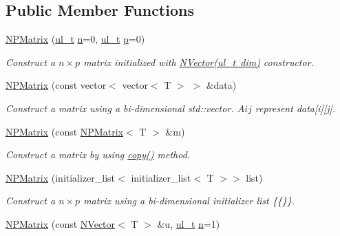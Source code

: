 \subsection*{Public Member Functions}
\begin{DoxyCompactItemize}
\item 
\mbox{\hyperlink{class_n_p_matrix_a911b2434435553b06276977f3a86bb87}{N\+P\+Matrix}} (\mbox{\hyperlink{typedef_8h_a1b140a2034db3f5dfe18a987745df43a}{ul\+\_\+t}} \mbox{\hyperlink{class_n_p_matrix_afc181b7652d9427125c72c38d7c1498d}{n}}=0, \mbox{\hyperlink{typedef_8h_a1b140a2034db3f5dfe18a987745df43a}{ul\+\_\+t}} \mbox{\hyperlink{class_n_p_matrix_a3beee8acb5babf62d2b4f212ac5d18e8}{p}}=0)
\begin{DoxyCompactList}\small\item\em Construct a $ n \times p $ matrix initialized with {\ttfamily \mbox{\hyperlink{class_n_vector_a58eee5f012e4e563d477788051fc7f1d}{N\+Vector(ul\+\_\+t dim)}}} constructor. \end{DoxyCompactList}\item 
\mbox{\hyperlink{class_n_p_matrix_ad5fc4003cdc740be5eed12134929101c}{N\+P\+Matrix}} (const vector$<$ vector$<$ T $>$ $>$ \&data)
\begin{DoxyCompactList}\small\item\em Construct a matrix using a bi-\/dimensional {\ttfamily std\+::vector}. $ Aij $ represent {\ttfamily data\mbox{[}i\mbox{]}\mbox{[}j\mbox{]}}. \end{DoxyCompactList}\item 
\mbox{\hyperlink{class_n_p_matrix_a0965ea26fdfab766bf993ea79fdad13c}{N\+P\+Matrix}} (const \mbox{\hyperlink{class_n_p_matrix}{N\+P\+Matrix}}$<$ T $>$ \&m)
\begin{DoxyCompactList}\small\item\em Construct a matrix by using {\ttfamily \mbox{\hyperlink{class_n_p_matrix_ad2420de13cf39828daf36fd74aea9d2d}{copy()}}} method. \end{DoxyCompactList}\item 
\mbox{\hyperlink{class_n_p_matrix_a738c748de3e3615da067264b629652b0}{N\+P\+Matrix}} (initializer\+\_\+list$<$ initializer\+\_\+list$<$ T $>$$>$ list)
\begin{DoxyCompactList}\small\item\em Construct a $ n \times p $ matrix using a bi-\/dimensional initializer list {\ttfamily \{\{\}\}}. \end{DoxyCompactList}\item 
\mbox{\hyperlink{class_n_p_matrix_a70eca6f9b11e5ab39db67edcba220f34}{N\+P\+Matrix}} (const \mbox{\hyperlink{class_n_vector}{N\+Vector}}$<$ T $>$ \&u, \mbox{\hyperlink{typedef_8h_a1b140a2034db3f5dfe18a987745df43a}{ul\+\_\+t}} \mbox{\hyperlink{class_n_p_matrix_afc181b7652d9427125c72c38d7c1498d}{n}}=1)
$$
\end{DoxyCompactItemize}
